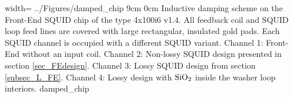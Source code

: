 {width=\textwidth} %
{../Figures/damped_chip}
{9cm} %
{0cm}
{Inductive damping scheme on the Front-End SQUID chip of the type 4x100i6 v1.4. All feedback coil and SQUID loop feed lines are covered with large rectangular, insulated gold pads. Each SQUID channel is occupied with a different SQUID variant. Channel 1: Front-End without an input coil. Channel 2: Non-lossy SQUID design presented in section \ref{sec_FEdesign}. Channel 3: Lossy SQUID design from section \ref{subsec_L_FE}. Channel 4: Lossy design with $\rm SiO_2$ inside the washer loop interiors.}
{damped_chip}

